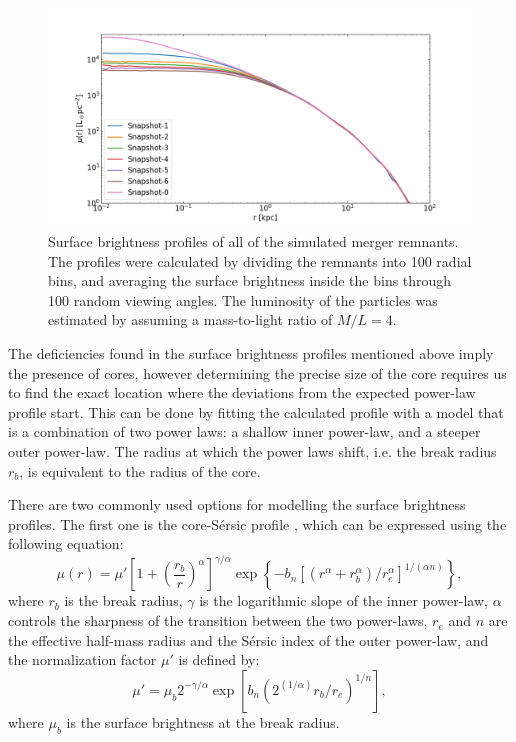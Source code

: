 \documentclass[english, oneside]{HYgradu}
\begin{document}
\begin{figure}[h]
	\centering
	\includegraphics[width=\textwidth]{SurfaceBrightnessProfiles.png}
	\caption{Surface brightness profiles of all of the simulated merger remnants. The profiles were calculated by dividing the remnants into 100 radial bins, and averaging the surface brightness inside the bins through 100 random viewing angles. The luminosity of the particles was estimated by assuming a mass-to-light ratio of $M/L = 4$.}
	\label{figure:surface_brightness}
\end{figure}

The deficiencies found in the surface brightness profiles mentioned above imply the presence of cores, however determining the precise size of the core requires us to find the exact location where the deviations from the expected power-law profile start. This can be done by fitting the calculated profile with a model that is a combination of two power laws: a shallow inner power-law, and a steeper outer power-law. The radius at which the power laws shift, i.e. the break radius $r_b$, is equivalent to the radius of the core. 

There are two commonly used options for modelling the surface brightness profiles. The first one is the core-Sérsic profile \citep{Graham2003}, which can be expressed using the following equation:
\begin{equation}
\mu(r) = \mu' \left[ 1 + \left( \frac{r_b}{r} \right)^\alpha \right]^{\gamma / \alpha} \exp \left\lbrace -b_n \left[ \left( r^\alpha + r_b^\alpha \right) / r_e^\alpha \right]^{1/(\alpha n)} \right\rbrace, \label{eq:core-sersic}
\end{equation}
where $r_b$ is the break radius, $\gamma$ is the logarithmic slope of the inner power-law, $\alpha$ controls the sharpness of the transition between the two power-laws, $r_e$ and $n$ are the effective half-mass radius and the Sérsic index of the outer power-law, and the normalization factor $\mu'$ is defined by:
\begin{equation}
\mu' = \mu_b 2^{-\gamma/\alpha} \exp \left[ b_n \left( 2^(1/\alpha) r_b/r_e \right)^{1/n} \right], 
\label{eq:mu_dot}
\end{equation}
where $\mu_b$ is the surface brightness at the break radius. 
\end{document}

